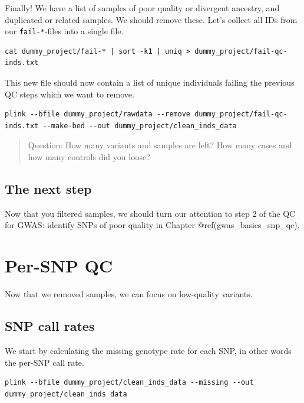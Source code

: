 \documentclass[
]{book}
\newcommand{\passthrough}[1]{#1}
\begin{document}
Finally! We have a list of samples of poor quality or divergent ancestry, and duplicated or related samples. We should remove these. Let's collect all IDs from our \passthrough{\lstinline!fail-*!}-files into a single file.

\begin{lstlisting}
cat dummy_project/fail-* | sort -k1 | uniq > dummy_project/fail-qc-inds.txt
\end{lstlisting}

This new file should now contain a list of unique individuals failing the previous QC steps which we want to remove.

\begin{lstlisting}
plink --bfile dummy_project/rawdata --remove dummy_project/fail-qc-inds.txt --make-bed --out dummy_project/clean_inds_data
\end{lstlisting}

\begin{quote}
Question: How many variants and samples are left? How many cases and how many controls did you loose?
\end{quote}

\hypertarget{the-next-step}{%
\section{The next step}\label{the-next-step}}

Now that you filtered samples, we should turn our attention to step 2 of the QC for GWAS: identify SNPs of poor quality in Chapter @ref(gwas\_basics\_snp\_qc).

\hypertarget{gwas_basics_snp_qc}{%
\chapter{Per-SNP QC}\label{gwas_basics_snp_qc}}

Now that we removed samples, we can focus on low-quality variants.

\hypertarget{snp-call-rates}{%
\section{SNP call rates}\label{snp-call-rates}}

We start by calculating the missing genotype rate for each SNP, in other words the per-SNP call rate.

\begin{lstlisting}
plink --bfile dummy_project/clean_inds_data --missing --out dummy_project/clean_inds_data
\end{lstlisting}
\end{document}
